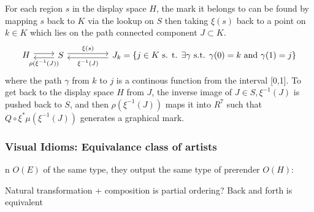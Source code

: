 \documentclass[../main.tex]{subfiles}
\begin{document}
For each region $s$ in the display space $H$, the mark  \cite{bertinIIPropertiesGraphic2011,carpendaleVisualRepresentationSemiology} it belongs to can be found by mapping $s$ back to $K$ via the lookup on $S$ then taking $\xi(s)$ back to a point on $k \in K$ which lies on the path connected component $J \subset K$. 
\begin{equation}
    \begin{tikzcd}
        H \arrow[r, shift left] & S \arrow[l, "\rho(\xi^{-1}(J))", shift left] \arrow[rr, "\xi(s)", shift left] &  & J_{k} =  \{j \in K \text{ s. t. } \exists \gamma \text{ s.t. } \gamma(0)=k \text{ and }\gamma(1)=j\} \arrow[ll, "\xi^{-1}(J)", shift left]
    \end{tikzcd}
    \label{eq:mark}
\end{equation}
where the path\cite{ConnectedSpace2020}  $\gamma$ from $k$ to $j$ is a continous function from the interval [0,1]. To get back to the display space $H$ from $J$, the inverse image of $J \in S, \xi^{-1}(J)$ is pushed back to $S$, and then $\rho(\xi^{-1}(J))$ maps it into $R^{7}$ such that $Q\circ\xi^*\mu(\xi^{-1}(J))$ generates a graphical mark.

\subsubsection{Visual Idioms: Equivalance class of artists}
n $O(E)$ of the same type, they output the same type of prerender $O(H)$:


Natural transformation + composition is partial ordering? Back and forth is equivalent 
\end{document}
